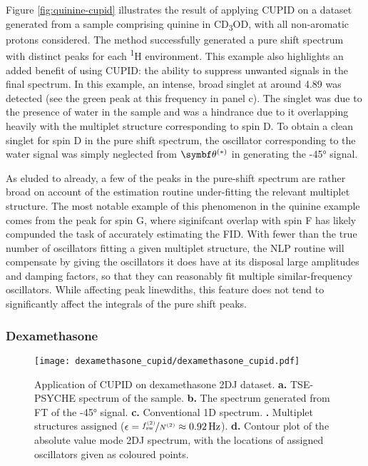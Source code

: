 Figure \ref{fig:quinine-cupid} illustrates the result of applying \ac{CUPID} on
a dataset generated from a sample comprising quinine in CD\textsubscript{3}OD,
with all non-aromatic protons considered. The method successfully generated a
pure shift spectrum with distinct peaks for each \textsuperscript{1}H
environment. This example also highlights an added benefit of using \ac{CUPID}:
the ability to suppress unwanted signals in the final spectrum. In this
example, an intense, broad singlet at around \qty{4.89}{\partspermillion}
was detected (see the green peak at this frequency in panel c).
The singlet was due to the presence of water in the sample and was a hindrance
due to it overlapping heavily with the multiplet structure corresponding to
spin D. To obtain a clean singlet for spin D in the pure shift spectrum, the
oscillator corresponding to the water signal was simply neglected from
$\bthstar$ in generating the \ang{-45} signal. 

As eluded to already, a few of the peaks in the pure-shift spectrum are rather
broad on account of the estimation routine under-fitting the relevant multiplet
structure. The most notable example of this phenomenon in the quinine example
comes from the peak for spin G, where siginifcant overlap with spin F has likely
compunded the task of accurately estimating the \ac{FID}. With fewer than the
true number of oscillators fitting a given multiplet structure, the \ac{NLP}
routine will compensate by giving the oscillators it does have at its disposal
large amplitudes and damping factors, so that they can reasonably fit multiple
similar-frequency oscillators.
While affecting peak linewdiths, this feature does not tend to significantly
affect the integrals of the pure shift peaks. 

\subsubsection{Dexamethasone}

\begin{sidewaysfigure}%
    \centering%
    \texttt{[image: dexamethasone\_cupid/dexamethasone\_cupid.pdf]}%
    \caption[
        Application of \ac{CUPID} on a dexamethasone dataset.
    ]{
        Application of \ac{CUPID} on dexamethasone \ac{2DJ} dataset.
        \textbf{a.} \ac{TSE-PSYCHE} spectrum of the sample.
        \textbf{b.} The spectrum generated from \ac{FT} of the \ang{-45}
        signal.
        \textbf{c.} Conventional \ac{1D} spectrum.
        \textbf{.} Multiplet structures assigned ($\epsilon =
        \nicefrac{f_{\mathrm{sw}}^{(2)}}{N^{(2)}} \approx \qty{0.92}{\hertz}$).
        \textbf{d.} Contour plot of the absolute value mode \ac{2DJ} spectrum,
        with the locations of assigned oscillators given as coloured points.
    }
    \label{fig:dexamethasone-cupid}%
\end{sidewaysfigure}%

